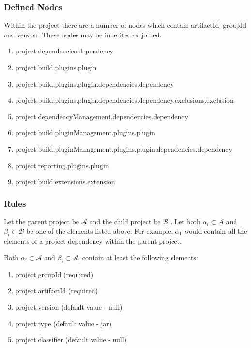 \documentclass[12pt]{amsart}
\begin{document}
\subsubsection{Defined Nodes}
Within the project there are a number of nodes which contain artifactId, groupId and version. These nodes may be inherited or joined.
\begin{enumerate}
\item project.dependencies.dependency
\item project.build.plugins.plugin
\item project.build.plugins.plugin.dependencies.dependency
\item project.build.plugins.plugin.dependencies.dependency.exclusions.exclusion
\item project.dependencyManagement.dependencies.dependency
\item project.build.pluginManagement.plugins.plugin
\item project.build.pluginManagement.plugins.plugin.dependencies.dependency
\item project.reporting.plugins.plugin
\item project.build.extensions.extension
\end{enumerate}

\subsubsection{Rules}
Let the parent project be \begin{math}\mathcal{A}\end{math} and the child project be  \begin{math}\mathcal{B}\end{math} . Let both \begin{math}\alpha_i \subset \mathcal{A}\end{math} and \begin{math}\beta_i \subset \mathcal{B}\end{math} be one of the elements listed above. For example,  \begin{math}\alpha_1\end{math} would contain all the elements of a project dependency within the parent project.

Both \begin{math}\alpha_i \subset \mathcal{A}\end{math} and \begin{math}\beta_i \subset \mathcal{A}\end{math}, contain at least the following elements:
\begin{enumerate}
\item project.groupId (required)
\item project.artifactId (required)
\item project.version (default value - null)
\item project.type (default value - jar)
\item project.classifier (default value - null)
\end{enumerate}
\end{document}
